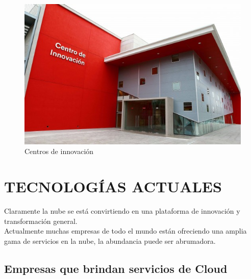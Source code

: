 \documentclass[a4paper, 12pt]{report}
\begin{document}
\begin{justify}
\begin{enumerate}[label=\alph*)]
		\begin{figure}[ht]
	\begin{center}
		\includegraphics[width=.8\textwidth]{innovacion}
		\caption{Centros de innovaci\'on}
		\label{fig:innovacion}
	\end{center}
\end{figure}
\end{enumerate}

\end{justify}

\vspace*{5em}
\chapter{TECNOLOG\'IAS ACTUALES}
\vspace*{-2em}

Claramente la nube se est\'a convirtiendo en una plataforma de innovaci\'on y transformaci\'on general.
\\ Actualmente muchas empresas de todo el mundo est\'an ofreciendo una amplia gama de servicios en la nube, la abundancia puede ser abrumadora.
 
\section{Empresas que brindan servicios de Cloud}
\end{document}
